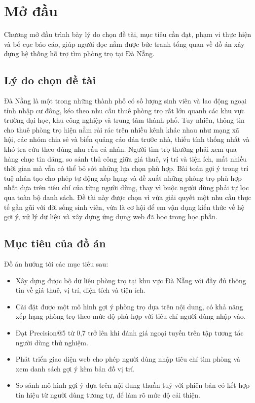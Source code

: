 \chapter{Mở đầu}
\label{ch:modau}

\begin{muctieu}
Chương mở đầu trình bày lý do chọn đề tài, mục tiêu cần đạt, phạm vi thực
hiện và bố cục báo cáo, giúp người đọc nắm được bức tranh tổng quan về đồ án
xây dựng hệ thống hỗ trợ tìm phòng trọ tại Đà Nẵng.
\end{muctieu}

\section{Lý do chọn đề tài}

Đà Nẵng là một trong những thành phố có số lượng sinh viên và lao động
ngoại tỉnh nhập cư đông, kéo theo nhu cầu thuê phòng trọ rất lớn quanh các
khu vực trường đại học, khu công nghiệp và trung tâm thành phố. Tuy nhiên,
thông tin cho thuê phòng trọ hiện nằm rải rác trên nhiều kênh khác nhau như
mạng xã hội, các nhóm chia sẻ và biển quảng cáo dán trước nhà, thiếu tính
thống nhất và khó tra cứu theo đúng nhu cầu cá nhân. Người tìm trọ thường
phải xem qua hàng chục tin đăng, so sánh thủ công giữa giá thuê, vị trí và
tiện ích, mất nhiều thời gian mà vẫn có thể bỏ sót những lựa chọn phù hợp.
Bài toán gợi ý  trong trí tuệ nhân tạo cho phép tự
động xếp hạng và đề xuất những phòng trọ phù hợp nhất dựa trên tiêu chí của
từng người dùng, thay vì buộc người dùng phải tự lọc qua toàn bộ danh sách.
Đề tài này được chọn vì vừa giải quyết một nhu cầu thực tế gần gũi với đời
sống sinh viên, vừa là cơ hội để em vận dụng kiến thức về hệ gợi ý, xử lý
dữ liệu và xây dựng ứng dụng web đã học trong học phần.

\section{Mục tiêu của đồ án}

Đồ án hướng tới các mục tiêu sau:
\begin{itemize}[leftmargin=1.6em, itemsep=2pt]
  \item Xây dựng được bộ dữ liệu phòng trọ tại khu vực Đà Nẵng với đầy đủ
        thông tin về giá thuê, vị trí, diện tích và tiện ích.
  \item Cài đặt được một mô hình gợi ý phòng trọ dựa trên nội dung, có khả
        năng xếp hạng phòng trọ theo mức độ phù hợp với tiêu chí người
        dùng nhập vào.
  \item Đạt Precision@5 từ 0,7 trở lên khi đánh giá ngoại tuyến trên tập
        tương tác người dùng thử nghiệm.
  \item Phát triển giao diện web cho phép người dùng nhập tiêu chí tìm
        phòng và xem danh sách gợi ý kèm bản đồ vị trí.
  \item So sánh mô hình gợi ý dựa trên nội dung thuần tuý với phiên bản có
        kết hợp tín hiệu từ người dùng tương tự, để làm rõ mức độ cải thiện.
\end{itemize}

